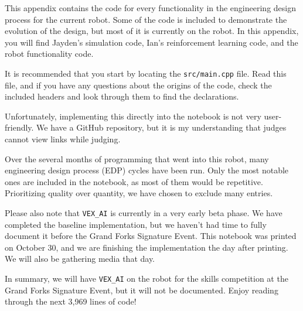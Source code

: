 
This appendix contains the code for every functionality in the engineering design process for the current robot. Some of the code is included to demonstrate the evolution of the design, but most of it is currently on the robot. In this appendix, you will find Jayden’s simulation code, Ian’s reinforcement learning code, and the robot functionality code.

It is recommended that you start by locating the \texttt{src/main.cpp} file. Read this file, and if you have any questions about the origins of the code, check the included headers and look through them to find the declarations.

Unfortunately, implementing this directly into the notebook is not very user-friendly. We have a GitHub repository, but it is my understanding that judges cannot view links while judging.

Over the several months of programming that went into this robot, many engineering design process (EDP) cycles have been run. Only the most notable ones are included in the notebook, as most of them would be repetitive. Prioritizing quality over quantity, we have chosen to exclude many entries.

Please also note that \texttt{VEX\_AI} is currently in a very early beta phase. We have completed the baseline implementation, but we haven’t had time to fully document it before the Grand Forks Signature Event. This notebook was printed on October 30, and we are finishing the implementation the day after printing. We will also be gathering media that day.

In summary, we will have \texttt{VEX\_AI} on the robot for the skills competition at the Grand Forks Signature Event, but it will not be documented. Enjoy reading through the next 3,969 lines of code!
